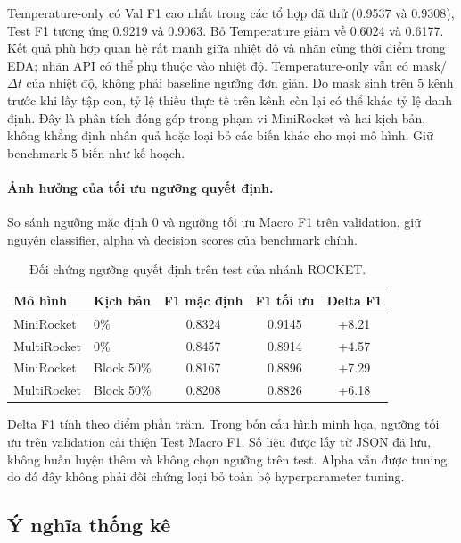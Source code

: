 Temperature-only có Val F1 cao nhất trong các tổ hợp đã thử (0.9537 và 0.9308), Test F1 tương ứng 0.9219 và 0.9063. Bỏ Temperature giảm về 0.6024 và 0.6177. Kết quả phù hợp quan hệ rất mạnh giữa nhiệt độ và nhãn cùng thời điểm trong EDA; nhãn API có thể phụ thuộc vào nhiệt độ. Temperature-only vẫn có mask/$\Delta t$ của nhiệt độ, không phải baseline ngưỡng đơn giản. Do mask sinh trên 5 kênh trước khi lấy tập con, tỷ lệ thiếu thực tế trên kênh còn lại có thể khác tỷ lệ danh định. Đây là phân tích đóng góp trong phạm vi MiniRocket và hai kịch bản, không khẳng định nhân quả hoặc loại bỏ các biến khác cho mọi mô hình. Giữ benchmark 5 biến như kế hoạch.


\paragraph{Ảnh hưởng của tối ưu ngưỡng quyết định.} So sánh ngưỡng mặc định 0 và ngưỡng tối ưu Macro F1 trên validation, giữ nguyên classifier, alpha và decision scores của benchmark chính.
\begin{table}[H]
\centering
\small
\caption{Đối chứng ngưỡng quyết định trên test của nhánh ROCKET.}
\label{tab:rocket-threshold}
\begin{tabular}{@{}llccc@{}}
\toprule
\textbf{Mô hình} & \textbf{Kịch bản} & \textbf{F1 mặc định} & \textbf{F1 tối ưu} & \textbf{Delta F1} \\
\midrule
MiniRocket & 0\% & 0.8324 & 0.9145 & +8.21 \\
MultiRocket & 0\% & 0.8457 & 0.8914 & +4.57 \\
MiniRocket & Block 50\% & 0.8167 & 0.8896 & +7.29 \\
MultiRocket & Block 50\% & 0.8208 & 0.8826 & +6.18 \\
\bottomrule
\end{tabular}
\end{table}
Delta F1 tính theo điểm phần trăm. Trong bốn cấu hình minh họa, ngưỡng tối ưu trên validation cải thiện Test Macro F1. Số liệu được lấy từ JSON đã lưu, không huấn luyện thêm và không chọn ngưỡng trên test. Alpha vẫn được tuning, do đó đây không phải đối chứng loại bỏ toàn bộ hyperparameter tuning.

\subsection{Ý nghĩa thống kê}
\label{sec:y-nghia-thong-ke}


